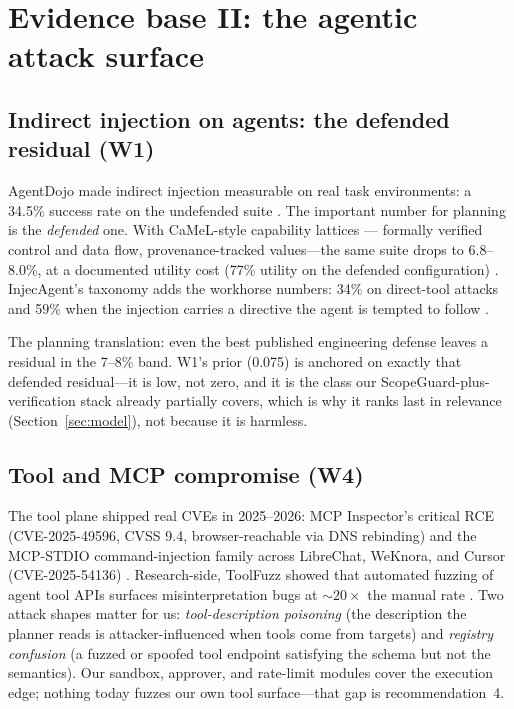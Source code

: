 \section{Evidence base II: the agentic attack surface}\label{sec:agentic}

\subsection{Indirect injection on agents: the defended residual (W1)}\label{sec:ipi}

AgentDojo made indirect injection measurable on real task environments: a 34.5\%
success rate on the undefended suite \cite{agentdojo}. The important number for
planning is the \emph{defended} one. With CaMeL-style capability lattices ---
formally verified control and data flow, provenance-tracked values---the same
suite drops to 6.8--8.0\%, at a documented utility cost (77\% utility on the
defended configuration) \cite{camel}. InjecAgent's taxonomy adds the workhorse
numbers: 34\% on direct-tool attacks and 59\% when the injection carries a
directive the agent is tempted to follow \cite{injecagent}.

The planning translation: even the best published engineering defense leaves a
residual in the 7--8\% band. W1's prior (0.075) is anchored on exactly that
defended residual---it is low, not zero, and it is the class our
ScopeGuard-plus-verification stack already partially covers, which is why it
ranks last in relevance (Section~\ref{sec:model}), not because it is harmless.

\subsection{Tool and MCP compromise (W4)}\label{sec:tools}

The tool plane shipped real CVEs in 2025--2026: MCP Inspector's critical RCE
(CVE-2025-49596, CVSS 9.4, browser-reachable via DNS rebinding) and the
MCP-STDIO command-injection family across LibreChat, WeKnora, and Cursor
(CVE-2025-54136) \cite{cve-2025-49596,oligo-mcp,ox-mcp-family}. Research-side,
ToolFuzz showed that automated fuzzing of agent tool APIs surfaces
misinterpretation bugs at ${\sim}20\times$ the manual rate \cite{toolfuzz}. Two
attack shapes matter for us: \emph{tool-description poisoning} (the description
the planner reads is attacker-influenced when tools come from targets) and
\emph{registry confusion} (a fuzzed or spoofed tool endpoint satisfying the
schema but not the semantics). Our sandbox, approver, and rate-limit modules
cover the execution edge; nothing today fuzzes our own tool surface---that gap
is recommendation~4.

